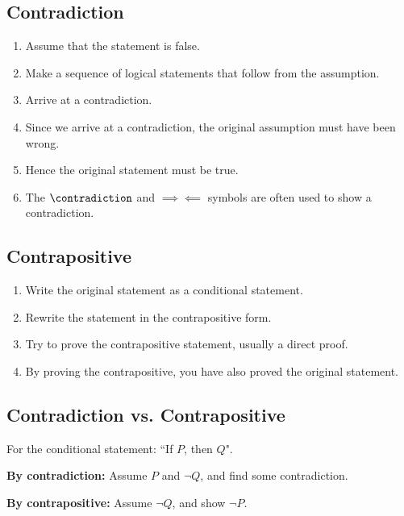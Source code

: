 \documentclass{article}
\begin{document}
\subsection{Contradiction}
\begin{enumerate}
    \item Assume that the statement is false.
    \item Make a sequence of logical statements that follow from the assumption.
    \item Arrive at a contradiction.
    \item Since we arrive at a contradiction, the original assumption must have been wrong.
    \item Hence the original statement must be true.
    \item The $\contradiction$ and $\implies\!\!\!\!\impliedby$ symbols
          are often used to show a contradiction.
\end{enumerate}
%
\subsection{Contrapositive}
\begin{enumerate}
    \item Write the original statement as a conditional statement.
    \item Rewrite the statement in the contrapositive form.
    \item Try to prove the contrapositive statement, usually a direct proof.
    \item By proving the contrapositive, you have also proved the original statement.
\end{enumerate}
%
\subsection{Contradiction vs. Contrapositive}
For the conditional statement: ``If $P$, then $Q$".

\textbf{By contradiction:} Assume $P$ and $\neg{Q}$, and find some contradiction.

\textbf{By contrapositive:} Assume $\neg{Q}$, and show $\neg{P}$.
%
\end{document}
